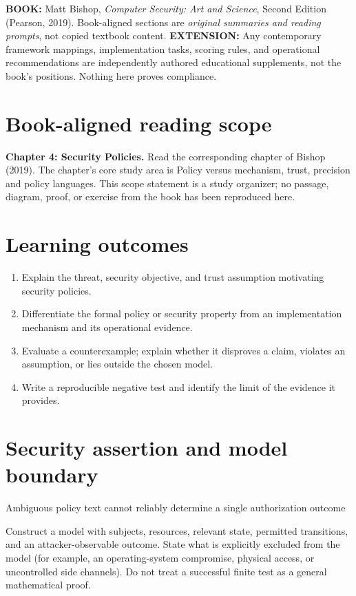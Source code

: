 \documentclass[10pt,letterpaper]{article}
\begin{document}
\makedoctocpage
\begin{notebox}
\textbf{BOOK:} Matt Bishop, \emph{Computer Security: Art and Science}, Second Edition (Pearson, 2019). Book-aligned sections are \emph{original summaries and reading prompts}, not copied textbook content.
\textbf{EXTENSION:} Any contemporary framework mappings, implementation tasks, scoring rules, and operational recommendations are independently authored educational supplements, not the book's positions. Nothing here proves compliance.
\end{notebox}
\section{Book-aligned reading scope}
\textbf{Chapter 4: Security Policies.} Read the corresponding chapter of Bishop (2019). The chapter's core study area is Policy versus mechanism, trust, precision and policy languages. This scope statement is a study organizer; no passage, diagram, proof, or exercise from the book has been reproduced here.
\section{Learning outcomes}
\begin{enumerate}
\item Explain the threat, security objective, and trust assumption motivating security policies.
\item Differentiate the formal policy or security property from an implementation mechanism and its operational evidence.
\item Evaluate a counterexample; explain whether it disproves a claim, violates an assumption, or lies outside the chosen model.
\item Write a reproducible negative test and identify the limit of the evidence it provides.
\end{enumerate}
\section{Security assertion and model boundary}
\begin{infobox}
Ambiguous policy text cannot reliably determine a single authorization outcome
\end{infobox}
Construct a model with subjects, resources, relevant state, permitted transitions, and an attacker-observable outcome. State what is explicitly excluded from the model (for example, an operating-system compromise, physical access, or uncontrolled side channels). Do not treat a successful finite test as a general mathematical proof.
\end{document}
